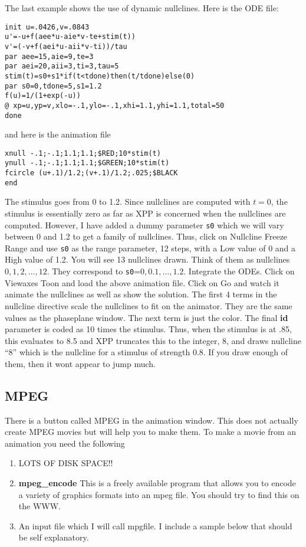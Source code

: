 \documentclass{article}
\begin{document}
The last example shows the use of dynamic nullclines. Here is the ODE
file:
\begin{verbatim}
init u=.0426,v=.0843
u'=-u+f(aee*u-aie*v-te+stim(t))
v'=(-v+f(aei*u-aii*v-ti))/tau
par aee=15,aie=9,te=3
par aei=20,aii=3,ti=3,tau=5
stim(t)=s0+s1*if(t<tdone)then(t/tdone)else(0)
par s0=0,tdone=5,s1=1.2
f(u)=1/(1+exp(-u))
@ xp=u,yp=v,xlo=-.1,ylo=-.1,xhi=1.1,yhi=1.1,total=50
done
\end{verbatim}
and here is the animation file
\begin{verbatim}
xnull -.1;-.1;1.1;1.1;$RED;10*stim(t)
ynull -.1;-.1;1.1;1.1;$GREEN;10*stim(t)
fcircle (u+.1)/1.2;(v+.1)/1.2;.025;$BLACK
end
\end{verbatim}
The stimulus goes from 0 to 1.2.  Since nullclines are computed with
$t=0$, the stimulus is essentially zero as far as XPP is concerned
when the nullclines are computed.  However, I have added a dummy
parameter {\tt s0} which we will vary between 0 and 1.2 to get a
family of nullclines.  Thus, click on Nullcline Freeze Range and use
{\tt s0} as the range parameter, 12 steps, with a Low value of 0 and a
High value of 1.2.  You will see 13 nullclines drawn. Think of them as
nullclines $0,1,2,\ldots,12$.  They correspond to {\tt s0}=$0,
0.1,\ldots, 1.2.$   Integrate the ODEs.   Click on Viewaxes Toon and
load the above animation file.  Click on Go and watch it animate the
nullclines as well as show the solution.  The first 4 terms in the
nullcline directive scale the nullclines to fit on the animator.  They
are the same values as the phaseplane window.  The next term is just
the color.  The final {\bf id} parameter is coded as 10 times the
stimulus.  Thus, when the stimulus is at .85, this evaluates to 8.5
and XPP truncates this to the integer, 8, and draws nullcline ``8''
which is the nullcline for a stimulus of strength 0.8.  If you draw
enough of them, then it wont appear to jump much.  

\subsection{MPEG}  There is a button called MPEG in the animation
window. This does not actually create MPEG movies but will help you to
make them. To make a movie from an animation you need the following
\begin{enumerate}
\item LOTS OF DISK SPACE!!
\item {\bf mpeg\_encode} This is a freely available program that allows
you to encode a variety of graphics formats into an mpeg file. You
should try to find this on the WWW. 
\item An input file which I will call mpgfile. I include a sample
below that should be self explanatory.
\end{enumerate}
\end{document}
